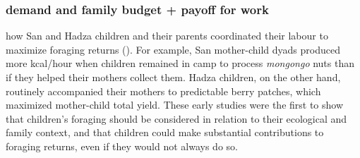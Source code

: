 \subsubsection{demand and family budget + payoff for work}
how San and Hadza children and their parents coordinated their labour to maximize foraging returns (\cite{hawkes_hadza_1995}). For example, San mother-child dyads produced more kcal/hour  when children remained in camp to process \textit{mongongo} nuts than if they helped their mothers collect them. Hadza children, on the other hand, routinely accompanied their mothers to predictable berry patches, which maximized mother-child total yield. These early studies were the first to show that children’s foraging should be considered in relation to their ecological and family context, and that children could make substantial contributions to foraging returns, even if they would not always do so.

\cite{bird_constraints_2002}
\cite{blurton_jones_modelling_1989}
\cite{bock_evolutionary_2002}
\cite{bird_constraints_2002}
 
